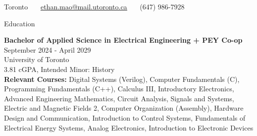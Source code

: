 \documentclass{resume}
\begin{document}
\vspace{-2.2em} %
{\centering
Toronto \ \textbar\ \ \href{mailto:ethan.mao@mail.utoronto.ca}{\underline{ethan.mao@mail.utoronto.ca}} \ \textbar\ \ (647) 986-7928\par}
\vspace{-0.5em} %


\begin{rSection}{Education}

{\bf Bachelor of Applied Science in Electrical Engineering + PEY Co-op} \hfill {September 2024 - April 2029}
\\ 
University of Toronto
\\
3.81 cGPA, Intended Minor: History
\\
{\bf Relevant Courses:} Digital Systems (Verilog), Computer Fundamentals (C), Programming Fundamentals (C++), Calculus III, Introductory Electronics, Advanced Engineering Mathematics, Circuit Analysis, Signals and Systems, Electric and Magnetic Fields 2, Computer Organization (Assembly), Hardware Design and Communication, Introduction to Control Systems, Fundamentals of Electrical Energy Systems, Analog Electronics, Introduction to Electronic Devices

\end{rSection}

\end{document}
